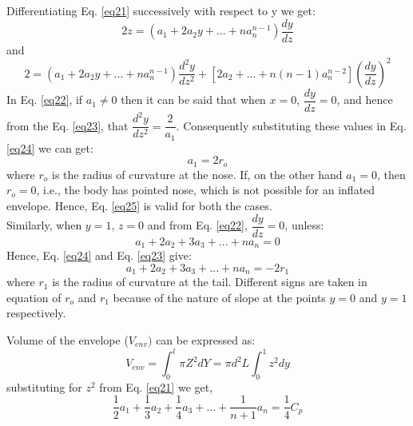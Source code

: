 Differentiating Eq. \ref{eq21} successively with respect to y we get:
\begin{equation}
\label{eq22}
2z = \left(a_1 + 2a_2y +...+ na_n^{n-1}\right)\dfrac{dy}{dz}
\end{equation}
and
\begin{equation}
\label{eq23}
2 = \left(a_1 + 2a_2y +...+ na_n^{n-1}\right)\dfrac{d^2y}{dz^2} + \left[2a_2 + ...+n(n-1)a_n^{n-2}\right]\left(\dfrac{dy}{dz}\right)^2
\end{equation}
In Eq. \ref{eq22}, if $a_1\ne 0$ then it can be said that when $x = 0$, $\dfrac{dy}{dz} = 0$, and hence from the Eq. \ref{eq23}, that
$\dfrac{d^2y}{dz^2} = \dfrac{2}{a_1}$. Consequently substituting these values in Eq. \ref{eq24} we can get:
\begin{equation}
\label{eq25}
a_1 = 2r_o
\end{equation}
where $r_o$ is the radius of curvature at the nose. If, on the other hand $a_1 = 0$, then $r_o = 0$, i.e., the body has pointed nose, which is not possible for an inflated envelope. Hence, Eq. \ref{eq25} is valid for both the cases.\\
Similarly, when $y = 1$, $z = 0$ and from Eq. \ref{eq22},     $\dfrac{dy}{dz} = 0$, unless:
\begin{equation}
\label{eq26}
a_1 + 2a_2 + 3a_3 +...+na_n = 0
\end{equation}
Hence, Eq. \ref{eq24} and Eq. \ref{eq23} give:
\begin{equation}
\label{eq27}
a_1 + 2a_2 + 3a_3 +...+na_n = -2r_1
\end{equation}
where $r_1$ is the radius of curvature at the tail. Different signs are taken in equation of $r_o$ and $r_1$ because of the nature of slope at the points $y = 0$ and $y = 1$ respectively.

Volume of the envelope ($ V_{env}) $ can be expressed as:
\begin{equation}
V_{env} = \int_{0}^{l}\pi Z^2 dY = \pi d^2L\int_{0}^{1}z^2dy	
\end{equation}
substituting for $z^2$ from Eq. \ref{eq21} we get,
\begin{equation}
\dfrac{1}{2}a_1	+ \dfrac{1}{3}a_2 + \dfrac{1}{4}a_3+ ... + \dfrac{1}{n+1}a_n = \dfrac{1}{4}C_p
\end{equation}

